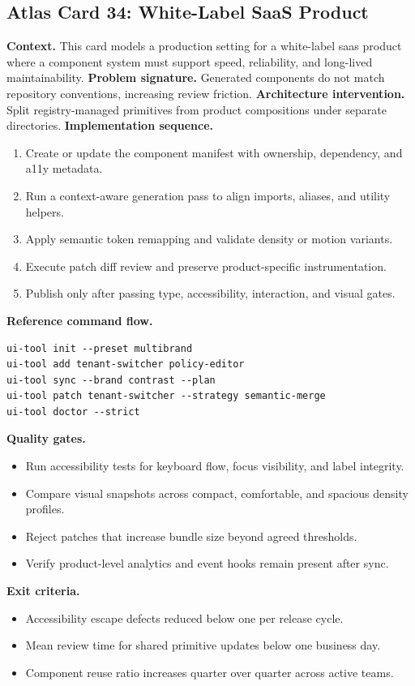 \subsection*{Atlas Card 34: White-Label SaaS Product}
\textbf{Context.} This card models a production setting for a white-label saas product where a component system must support speed, reliability, and long-lived maintainability.
\textbf{Problem signature.} Generated components do not match repository conventions, increasing review friction.
\textbf{Architecture intervention.} Split registry-managed primitives from product compositions under separate directories.
\textbf{Implementation sequence.}
\begin{enumerate}[leftmargin=*, itemsep=0.28em]
  \item Create or update the component manifest with ownership, dependency, and a11y metadata.
  \item Run a context-aware generation pass to align imports, aliases, and utility helpers.
  \item Apply semantic token remapping and validate density or motion variants.
  \item Execute patch diff review and preserve product-specific instrumentation.
  \item Publish only after passing type, accessibility, interaction, and visual gates.
\end{enumerate}
\textbf{Reference command flow.}
\begin{verbatim}
ui-tool init --preset multibrand
ui-tool add tenant-switcher policy-editor
ui-tool sync --brand contrast --plan
ui-tool patch tenant-switcher --strategy semantic-merge
ui-tool doctor --strict
\end{verbatim}
\textbf{Quality gates.}
\begin{itemize}[leftmargin=*, itemsep=0.24em]
  \item Run accessibility tests for keyboard flow, focus visibility, and label integrity.
  \item Compare visual snapshots across compact, comfortable, and spacious density profiles.
  \item Reject patches that increase bundle size beyond agreed thresholds.
  \item Verify product-level analytics and event hooks remain present after sync.
\end{itemize}
\textbf{Exit criteria.}
\begin{itemize}[leftmargin=*, itemsep=0.24em]
  \item Accessibility escape defects reduced below one per release cycle.
  \item Mean review time for shared primitive updates below one business day.
  \item Component reuse ratio increases quarter over quarter across active teams.
\end{itemize}
\clearpage
